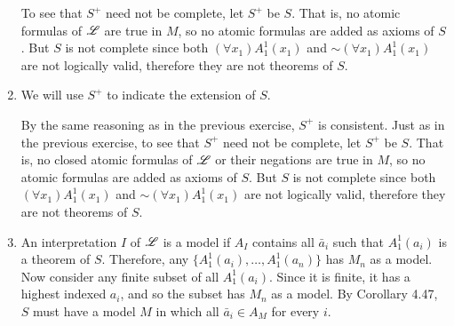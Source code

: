 \begin{enumerate}
    To see that \(S^+\) need not be complete, let \(S^+\) be \(S\). That is, no atomic formulas of \(\mathscr{L}\) are true in \(M\), so no atomic formulas are added as axioms of \(S\). But \(S\) is not complete since both \((\forall x_1)A^1_1(x_1)\) and \(\sim(\forall x_1)A^1_1(x_1)\) are not logically valid, therefore they are not theorems of \(S\).

  \item %
    We will use \(S^+\) to indicate the extension of \(S\). 

    By the same reasoning as in the previous exercise, \(S^+\) is consistent. Just as in the previous exercise, to see that \(S^+\) need not be complete, let \(S^+\) be \(S\). That is, no closed atomic formulas of \(\mathscr{L}\) or their negations are true in \(M\), so no atomic formulas are added as axioms of \(S\). But \(S\) is not complete since both \((\forall x_1)A^1_1(x_1)\) and \(\sim(\forall x_1)A^1_1(x_1)\) are not logically valid, therefore they are not theorems of \(S\).

  \item %
    An interpretation \(I\) of \(\mathscr{L}\) is a model if \(A_I\) contains all \(\bar{a}_i\) such that \(A^1_1(a_i)\) is a theorem of \(S\). Therefore, any \(\{A^1_1(a_i), \dots, A^1_1(a_n)\}\) has \(M_n\) as a model. Now consider any finite subset of all \(A^1_1(a_i)\). Since it is finite, it has a highest indexed \(a_i\), and so the subset has \(M_n\) as a model. By Corollary 4.47, \(S\) must have a model \(M\) in which all \(\bar{a}_i \in A_M\) for every \(i\).
\end{enumerate}
